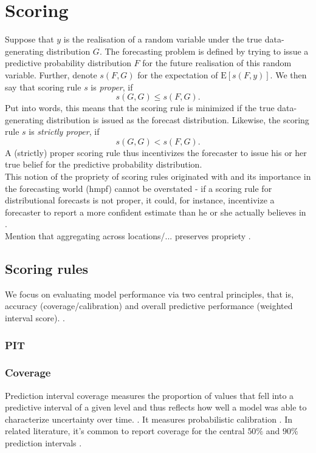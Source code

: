 \section{Scoring}
Suppose that $y$ is the realisation of a random variable under the true data-generating distribution $G$. The forecasting problem is defined by trying to issue a predictive probability distribution $F$ for the future realisation of this random variable. Further, denote $s(F,G)$ for the expectation of $\text{E}[s(F,y)]$. We then say that scoring rule $s$ is \textit{proper}, if 
\[s(G,G) \leq s(F,G).\]
Put into words, this means that the scoring rule is minimized if the true data-generating distribution is issued as the forecast distribution. Likewise, the scoring rule $s$ is \textit{strictly proper}, if 
\[s(G,G) < s(F,G).\] 
A (strictly) proper scoring rule thus incentivizes the forecaster to issue his or her true belief for the predictive probability distribution.\\
This notion of the propriety of scoring rules originated with  and its importance in the forecasting world (hmpf) cannot be overstated - if a scoring rule for distributional forecasts is not proper, it could, for instance, incentivize a forecaster to report a more confident estimate than he or she actually believes in . \\
Mention that aggregating across locations/... preserves propriety \citep{bracher_evaluating_2021}.
\subsection{Scoring rules}
We focus on evaluating model performance via two central principles, that is, accuracy (coverage/calibration) and overall predictive performance (weighted interval score). \citep{sherratt_predictive_2022}.
\subsubsection{PIT}
\subsubsection{Coverage}
Prediction interval coverage measures the proportion of values that fell into a predictive interval of a given level and thus reflects how well a model was able to characterize uncertainty over time.\citep{cramer_evaluation_2022} . It measures probabilistic calibration \citep{bosse_evaluating_2022}.
In related literature, it's common to report coverage for the central $50\%$ and $90\%$ prediction intervals .
